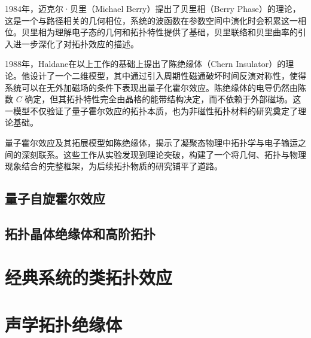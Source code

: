 1984年，迈克尔·贝里（Michael Berry）提出了贝里相（Berry Phase）的理论\cite{d4}，这是一个与路径相关的几何相位，系统的波函数在参数空间中演化时会积累这一相位。贝里相为理解电子态的几何和拓扑特性提供了基础，贝里联络和贝里曲率的引入进一步深化了对拓扑效应的描述。

1988年，Haldane在以上工作的基础上提出了陈绝缘体（Chern Insulator）的理论\cite{d5}。他设计了一个二维模型，其中通过引入周期性磁通破坏时间反演对称性，使得系统可以在无外加磁场的条件下表现出量子化霍尔效应。陈绝缘体的电导仍然由陈数 \( C \) 确定，但其拓扑特性完全由晶格的能带结构决定，而不依赖于外部磁场。这一模型不仅验证了量子霍尔效应的拓扑本质，也为非磁性拓扑材料的研究奠定了理论基础。

量子霍尔效应及其拓展模型如陈绝缘体，揭示了凝聚态物理中拓扑学与电子输运之间的深刻联系。这些工作从实验发现到理论突破，构建了一个将几何、拓扑与物理现象结合的完整框架，为后续拓扑物质的研究铺平了道路。


\subsection{量子自旋霍尔效应}

\subsection{拓扑晶体绝缘体和高阶拓扑}

\section{经典系统的类拓扑效应}

\section{声学拓扑绝缘体}